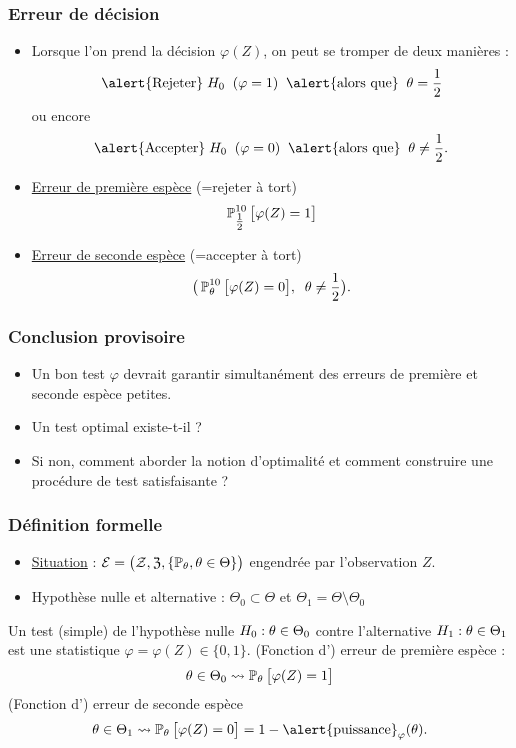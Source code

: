 \begin{frame}
\frametitle{Erreur de décision}
\begin{itemize}
\item
Lorsque l'on prend la décision $\varphi(Z)$, on peut se \alert{tromper de deux manières} :
$$\text{\alert{Rejeter}}\; H_0\;\;(\varphi=1)\;\;\text{\alert{alors que}}\;\;\truetheta = \frac{1}{2}$$
ou encore
$$\text{\alert{Accepter}}\;H_0\;\;(\varphi=0)\;\;\text{\alert{alors que}}\;\;\truetheta  \neq \frac{1}{2}.$$
\item \underline{Erreur de première espèce}  \alert{(=rejeter à tort)}
$$\operatorname{{\mathbb P}}_{\tfrac{1}{2}}^{10}\big[\varphi(Z)=1\big]$$
\item \underline{Erreur de seconde espèce}  \alert{(=accepter à tort)}
$$\big(\operatorname{{\mathbb P}}_\theta^{10}\big[\varphi(Z)=0\big],\;\;\theta \neq \frac{1}{2}\big).$$
\end{itemize}
\end{frame}



\begin{frame}
\frametitle{Conclusion provisoire}
\begin{itemize}
\item Un  bon test  $\varphi$ devrait garantir \alert{ simultanément} des erreurs de première et seconde espèce \alert{petites}.
\item \alert{Un test optimal existe-t-il ?}
\item Si \alert{non}, comment aborder la notion d'optimalité et comment construire une procédure de test satisfaisante ?
\end{itemize}
\end{frame}

\begin{frame}
\frametitle{Définition formelle}
\begin{itemize}
\item \underline{Situation} : ${\mathcal E} = \big({\mathcal Z}, \mathfrak{Z}, \{\operatorname{{\mathbb P}}_\theta, \theta \in \Theta\}\big)$ engendrée par l'observation $Z$.
\item \alert{Hypothèse nulle et alternative} : $\Theta_0 \subset \Theta$ et $\Theta_1 = \Theta \setminus \Theta_0$   
\end{itemize}
\begin{df} Un test (simple) de l'hypothèse nulle $H_0: \theta \in \Theta_0$ contre l'alternative $H_1:\theta \in \Theta_1$ est une statistique $\varphi  = \varphi(Z) \in \{0,1\}$.
 (Fonction d') \alert{erreur de première espèce} :
$$\theta \in \Theta_0 \leadsto \operatorname{{\mathbb P}}_\theta\big[\varphi(Z) = 1\big]$$
 (Fonction d') \alert{erreur de seconde espèce}
$$\truetheta \in \Theta_1 \leadsto \PP_\truetheta \big[\varphi(Z) = 0\big] = 1- \text{\alert{puissance}}_\varphi(\truetheta).$$
\end{df}
\end{frame}




